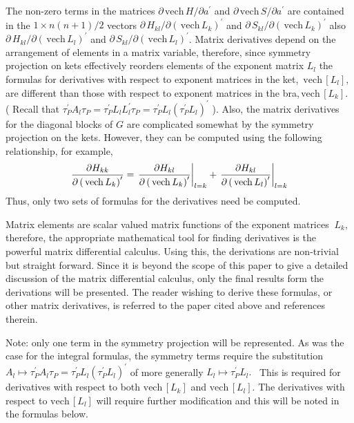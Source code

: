 \documentclass[12pt,doublespace]{article}
\begin{document}
The non-zero terms in the matrices $\partial \,\mathrm{vech}\,H/\partial
a^{\prime }$ and $\partial \,\mathrm{vech}\,S/\partial a^{\prime }$ are
contained in the $1\times n\left( n+1\right) /2$ vectors $\partial
\,H_{kl}/\partial \left( \,\mathrm{vech}\,L_{k}\right) ^{\prime }$ and $%
\partial \,S_{kl}/\partial \left( \,\mathrm{vech}\,L_{k}\right) ^{\prime }$
also $\partial \,H_{kl}/\partial \left( \,\mathrm{vech}\,L_{l}\right)
^{\prime }$ and $\partial \,S_{kl}/\partial \left( \,\mathrm{vech}%
\,L_{l}\right) ^{\prime }$. Matrix derivatives depend on the arrangement of
elements in a matrix variable, therefore, since symmetry projection on kets
effectively reorders elements of the exponent matrix $L_{l}$ the formulas
for derivatives with respect to exponent matrices in the ket, $\,\mathrm{vech%
}\,\left[ L_{l}\right] ,$ are different than those with respect to exponent
matrices in the bra,$\,\mathrm{vech}\,\left[ L_{k}\right] $. ( Recall that $%
\tau _{P}^{\prime }A_{l}\tau _{P}=\tau _{P}^{\prime }L_{l}L_{l}^{\prime
}\tau _{P}=\tau _{P}^{\prime }L_{l}\left( \tau _{P}^{\prime }L_{l}\right)
^{\prime }$ ). Also, the matrix derivatives for the diagonal blocks of $G$
are complicated somewhat by the symmetry projection on the kets. However,
they can be computed using the following relationship, for example, 
\begin{equation}
\frac{\partial H_{kk}}{\partial \left( \,\mathrm{vech}\,L_{k}\right)
^{\prime }}=\left. \frac{\partial H_{kl}}{\partial \left( \,\mathrm{vech}%
\,L_{k}\right) ^{\prime }}\right| _{l=k}+\left. \frac{\partial H_{kl}}{%
\partial \left( \,\mathrm{vech}\,L_{l}\right) ^{\prime }}\right| _{l=k}
\end{equation}
Thus, only two sets of formulas for the derivatives need be computed.

Matrix elements are scalar valued matrix functions of the exponent matrices $%
\ L_{k},$ therefore, the appropriate mathematical tool for finding
derivatives is the powerful matrix differential calculus\cite{Kinghorn95a}.
Using this, the derivations are non-trivial but straight forward. Since it
is beyond the scope of this paper to give a detailed discussion of the
matrix differential calculus, only the final results form the derivations
will be presented. The reader wishing to derive these formulas, or other
matrix derivatives, is referred to the paper cited above and references
therein.

Note: only one term in the symmetry projection will be represented. As was
the case for the integral formulas, the symmetry terms require the
substitution $A_{l}\mapsto \tau _{P}^{\prime }A_{l}\tau _{P}=\tau
_{P}^{\prime }L_{l}\left( \tau _{P}^{\prime }L_{l}\right) ^{\prime }$ of
more generally $L_{l}\mapsto \tau _{P}^{\prime }L_{l}.$ \ This is required
for derivatives with respect to both $\mathrm{vech}\,\left[ L_{k}\right] $
and $\mathrm{vech}\,\left[ L_{l}\right] .$ The derivatives with respect to $%
\mathrm{vech}\,\left[ L_{l}\right] $ will require further modification and
this will be noted in the formulas below.
\end{document}

